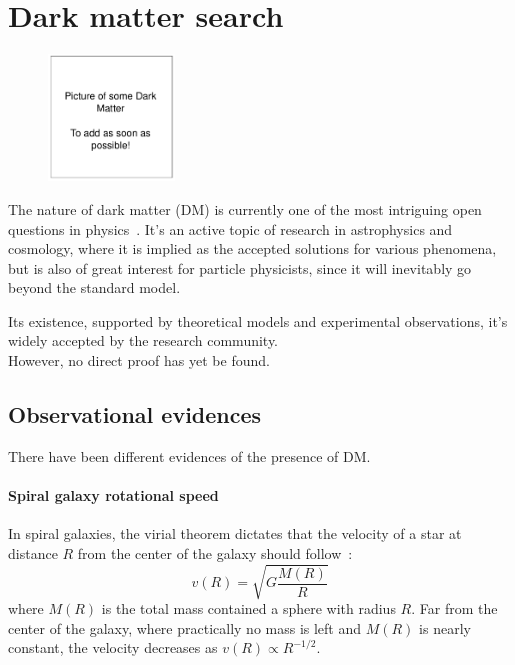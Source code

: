 
\section{Dark matter search}

\begin{figure}[htp]
    \centering
    \includegraphics[width=0.3\textwidth]{Theory/figures/dark_matter_pic.pdf}
\end{figure}

The nature of dark matter (DM) is currently one of the most intriguing open questions in physics~\cite{Arbey2021}.
It's an active topic of research in astrophysics and cosmology, where it is implied as the accepted solutions for various phenomena, but is also of great interest for particle physicists, since it will inevitably go beyond the standard model.

Its existence, supported by theoretical models and experimental observations, it's widely accepted by the research community.\\
However, no direct proof has yet be found.

\subsection{Observational evidences}

There have been different evidences of the presence of DM.

\paragraph{Spiral galaxy rotational speed}

In spiral galaxies, the virial theorem dictates that the velocity of a star at distance $R$ from the center of the galaxy should follow~\cite{Belenchia2022}:
\begin{equation}
    v(R) = \sqrt{G\frac{M(R)}{R}}
\end{equation}
where $M(R)$ is the total mass contained a sphere with radius $R$.
Far from the center of the galaxy, where practically no mass is left and $M(R)$ is nearly constant, the velocity decreases as $v (R) \propto R^{-1/2}$.

